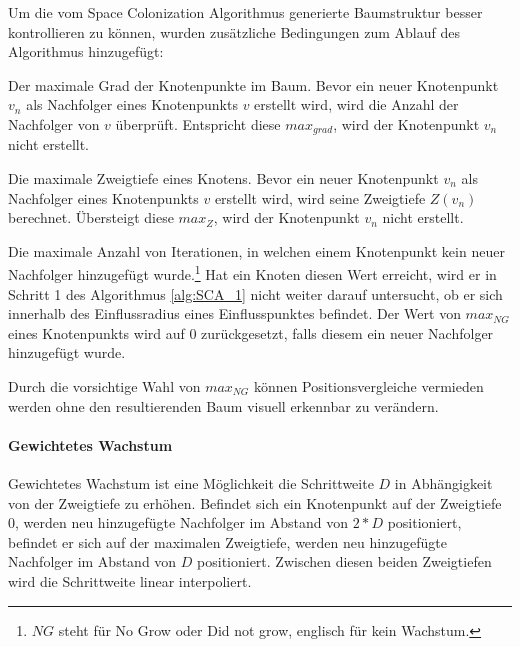 Um die vom Space Colonization Algorithmus generierte Baumstruktur besser kontrollieren zu können, wurden zusätzliche Bedingungen zum Ablauf des Algorithmus hinzugefügt:
\begin{description}[labelindent]
	\item[\boldmath$max_{grad}$] Der maximale Grad der Knotenpunkte im Baum. Bevor ein neuer Knotenpunkt $v_n$ als Nachfolger eines Knotenpunkts $v$ erstellt wird, wird die Anzahl der Nachfolger von $v$ überprüft. Entspricht diese $max_{grad}$, wird der Knotenpunkt $v_n$ nicht erstellt.\\
	
	\item[\boldmath$max_{Z}$] Die maximale Zweigtiefe eines Knotens. Bevor ein neuer Knotenpunkt $v_n$ als Nachfolger eines Knotenpunkts $v$ erstellt wird, wird seine Zweigtiefe $Z(v_n)$ berechnet. Übersteigt diese $max_{Z}$, wird der Knotenpunkt $v_n$ nicht erstellt.\\
	
	\item[\boldmath$max_{NG}$] Die maximale Anzahl von Iterationen, in welchen einem Knotenpunkt kein neuer Nachfolger hinzugefügt wurde.\footnote{$NG$ steht für \glqq No Grow\grqq{} oder \glqq Did not grow\grqq, englisch für \glqq kein Wachstum\grqq.} Hat ein Knoten diesen Wert erreicht, wird er in Schritt 1 des Algorithmus \ref{alg:SCA_1} nicht weiter darauf untersucht, ob er sich innerhalb des Einflussradius eines Einflusspunktes befindet. Der Wert von $max_{NG}$ eines Knotenpunkts wird auf $0$ zurückgesetzt, falls diesem ein neuer Nachfolger hinzugefügt wurde.
	
	Durch die vorsichtige Wahl von $max_{NG}$ können Positionsvergleiche vermieden werden ohne den resultierenden Baum visuell erkennbar zu verändern.
\end{description}

\paragraph{Gewichtetes Wachstum}

Gewichtetes Wachstum ist eine Möglichkeit die Schrittweite $D$ in Abhängigkeit von der Zweigtiefe zu erhöhen. Befindet sich ein Knotenpunkt auf der Zweigtiefe $0$, werden neu hinzugefügte Nachfolger im Abstand von $2 * D$ positioniert, befindet er sich auf der maximalen Zweigtiefe, werden neu hinzugefügte Nachfolger im Abstand von $D$ positioniert. Zwischen diesen beiden Zweigtiefen wird die Schrittweite linear interpoliert.

